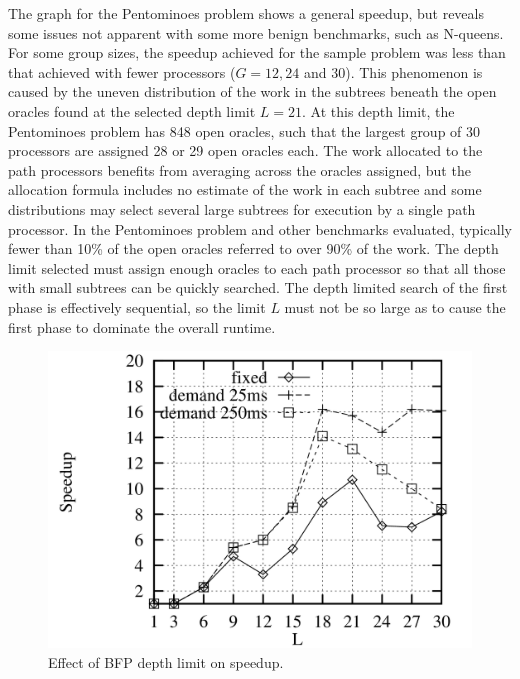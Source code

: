 \documentclass[a4paper,11pt,twoside]{article}
\begin{document}
The graph for the Pentominoes problem shows a general speedup, but
reveals some issues not apparent with some more benign benchmarks,
such as N-queens.
For some group sizes, the speedup achieved for the sample problem
was less than that achieved with fewer processors ($G=12, 24$ and $30$).
This phenomenon is caused by the uneven distribution of the work
in the subtrees beneath the open oracles found at the selected
depth limit $L=21$.  At this depth limit, the Pentominoes problem
has 848 open oracles, such that the largest group of 30 processors
are assigned 28 or 29 open oracles each.  The work allocated to the
path processors benefits from averaging across the oracles assigned,
but the allocation formula includes no estimate of the work in each
subtree and some distributions may select several large subtrees for
execution by a single path processor.  In the Pentominoes problem and
other benchmarks evaluated, typically fewer than 10\% of the open
oracles referred to over 90\% of the work.  The depth limit selected
must assign enough oracles to each path processor so that all those with
small subtrees can be quickly searched.  The depth limited search of
the first phase is effectively sequential, so the limit $L$ must not be
so large as to cause the first phase to dominate the overall runtime.

\begin{figure}
  \includegraphics[width=\linewidth]{pent_bfp_l.png}
  \caption{Effect of BFP depth limit on speedup.}
  \label{pent_bfp_l}
\end{figure}
\end{document}
